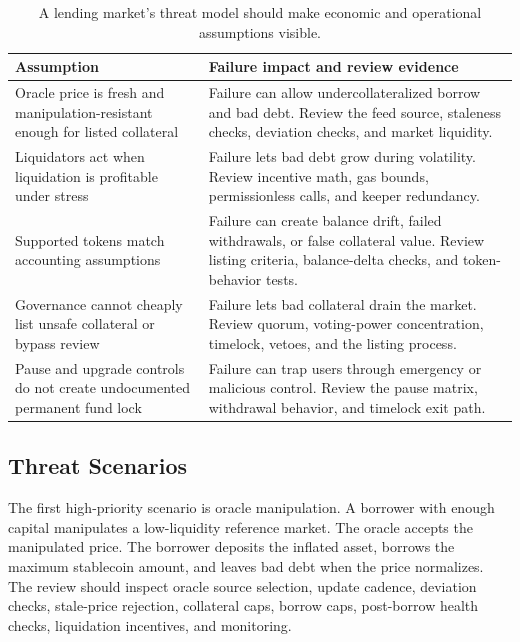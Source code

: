 \begin{table}[htbp]
\centering
\small
\renewcommand{\arraystretch}{1.18}
\begin{tabularx}{\textwidth}{@{}>{\RaggedRight\arraybackslash}p{}X@{}}
\toprule
Assumption & Failure impact and review evidence \\
\midrule
Oracle price is fresh and manipulation-resistant enough for listed collateral & Failure can allow undercollateralized borrow and bad debt. Review the feed source, staleness checks, deviation checks, and market liquidity. \\
Liquidators act when liquidation is profitable under stress & Failure lets bad debt grow during volatility. Review incentive math, gas bounds, permissionless calls, and keeper redundancy. \\
Supported tokens match accounting assumptions & Failure can create balance drift, failed withdrawals, or false collateral value. Review listing criteria, balance-delta checks, and token-behavior tests. \\
Governance cannot cheaply list unsafe collateral or bypass review & Failure lets bad collateral drain the market. Review quorum, voting-power concentration, timelock, vetoes, and the listing process. \\
Pause and upgrade controls do not create undocumented permanent fund lock & Failure can trap users through emergency or malicious control. Review the pause matrix, withdrawal behavior, and timelock exit path. \\
\bottomrule
\end{tabularx}
\caption{A lending market's threat model should make economic and operational assumptions visible.}
\end{table}

\subsection{Threat Scenarios}

The first high-priority scenario is oracle manipulation. A borrower with enough capital manipulates a low-liquidity reference market. The oracle accepts the manipulated price. The borrower deposits the inflated asset, borrows the maximum stablecoin amount, and leaves bad debt when the price normalizes. The review should inspect oracle source selection, update cadence, deviation checks, stale-price rejection, collateral caps, borrow caps, post-borrow health checks, liquidation incentives, and monitoring.

